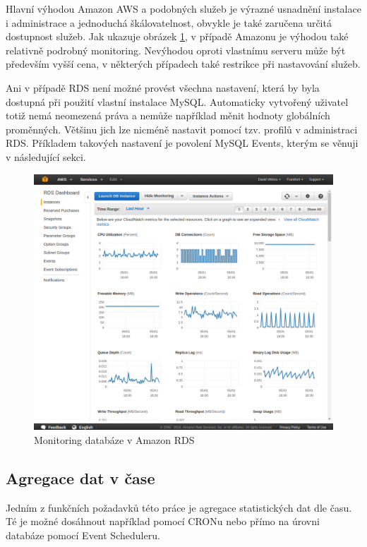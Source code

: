 \documentclass[thesis=B,czech]{FITthesis}[2012/06/26]
\begin{document}
	Hlavní výhodou Amazon AWS a podobných služeb je výrazné usnadnění instalace i administrace a jednoduchá škálovatelnost, obvykle je také zaručena určitá dostupnost služeb. Jak ukazuje obrázek \ref{fig:aws_monitoring}, v případě Amazonu je výhodou také relativně podrobný monitoring. Nevýhodou oproti vlastnímu serveru může být především vyšší cena, v některých případech také restrikce při nastavování služeb. 
	
	Ani v případě RDS není možné provést všechna nastavení, která by byla dostupná při použití vlastní instalace MySQL. Automaticky vytvořený uživatel totiž nemá neomezená práva a nemůže například měnit hodnoty globálních proměnných. Většinu jich lze nicméně nastavit pomocí tzv. profilů v administraci RDS. Příkladem takových nastavení je povolení MySQL Events, kterým se věnuji v následující sekci. 

\begin{figure}[ht]
   	\centering
   	\includegraphics[width=1\textwidth]{images/aws-monitoring.png}
   	\caption{Monitoring databáze v Amazon RDS}
   	\label{fig:aws_monitoring}
\end{figure}
	
\subsection{Agregace dat v čase}
\label{agregace-dat}
	Jedním z funkčních požadavků této práce je agregace statistických dat dle času. Té je možné dosáhnout například pomocí CRONu nebo přímo na úrovni databáze pomocí Event Scheduleru. 
	
\end{document}
